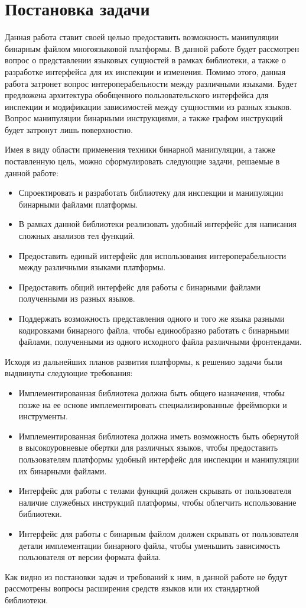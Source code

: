 \section{Постановка задачи}
\label{sec:Chapter1} 

\sloppy

Данная работа ставит своей целью предоставить возможность манипуляции бинарным файлом многоязыковой платформы. В данной работе будет рассмотрен вопрос о представлении языковых сущностей в рамках библиотеки, а также о разработке интерфейса для их инспекции и изменения. Помимо этого, данная работа затронет вопрос интероперабельности между различными языками. Будет предложена архитектура обобщенного пользовательского интерфейса для инспекции и модификации зависимостей между сущностями из разных языков. Вопрос манипуляции бинарными инструкциями, а также графом инструкций будет затронут лишь поверхностно.

Имея в виду области применения техники бинарной манипуляции, а также поставленную цель, можно сформулировать следующие задачи, решаемые в данной работе:

\begin{itemize}
    \item Спроектировать и разработать библиотеку для инспекции и манипуляции бинарными файлами платформы.
    \item В рамках данной библиотеки реализовать удобный интерфейс для написания сложных анализов тел функций.
    \item Предоставить единый интерфейс для использования интероперабельности между различными языками платформы.
    \item Предоставить общий интерфейс для работы с бинарными файлами полученными из разных языков.
    \item Поддержать возможность представления одного и того же языка разными кодировками бинарного файла, чтобы единообразно работать с бинарными файлами, полученными из одного исходного файла различными фронтендами.
\end{itemize}

Исходя из дальнейших планов развития платформы, к решению задачи были выдвинуты следующие требования:

\begin{itemize}
    \item Имплементированная библиотека должна быть общего назначения, чтобы позже на ее основе имплементировать специализированные фреймворки и инструменты.
    \item Имплементированная библиотека должна иметь возможность быть обернутой в высокоуровневые обертки для различных языков, чтобы предоставить пользователям платформы удобный интерфейс для инспекции и манипуляции их бинарными файлами.
    \item Интерфейс для работы с телами функций должен скрывать от пользователя наличие служебных инструкций платформы, чтобы облегчить использование библиотеки.
    \item Интерфейс для работы с бинарным файлом должен скрывать от пользователя детали имплементации бинарного файла, чтобы уменьшить зависимость пользователя от версии формата файла.
\end{itemize}

Как видно из постановки задач и требований к ним, в данной работе не будут рассмотрены вопросы расширения средств языков или их стандартной библиотеки.

\newpage
